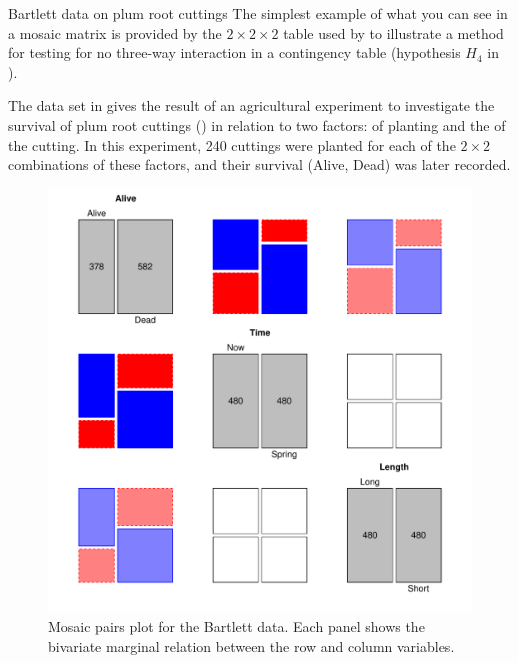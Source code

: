 \documentclass[11pt]{book}
\renewenvironment{knitrout}{\small\renewcommand{\baselinestretch}{.85}}{} %
\begin{document}
\begin{Example}[bartlett]{Bartlett data on plum root cuttings}
The simplest example of what you can see in a mosaic matrix is
provided by the $2 \times 2 \times 2$ table
used by \citet{Bartlett:35}
to illustrate a method for testing for no three-way interaction in a contingency table
(hypothesis $H_4$ in ).

The data set  in 
gives the result of an agricultural experiment to 
investigate the survival of plum root cuttings ()
in relation to two factors:  of planting and the  of the cutting.
In this experiment, 240 cuttings were planted for each of the $2 \times 2$ combinations of these factors, and their survival (Alive, Dead) was later recorded.

\begin{knitrout}
\color{fgcolor}\begin{kframe}
\begin{alltt}
 
\end{alltt}
\end{kframe}\begin{figure}[!htb]


\centerline{\includegraphics[width=.8\textwidth]{ch05/fig/bartlett-pairs} }

\caption[Mosaic pairs plot for the Bartlett data]{Mosaic pairs plot for the Bartlett data. Each panel shows the bivariate marginal relation between the row and column variables.\label{fig:bartlett-pairs}}
\end{figure}



\end{knitrout}
\end{Example}
\end{document}
